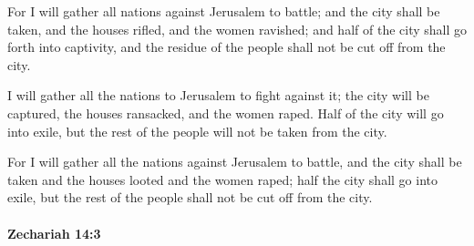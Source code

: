 			\begin{versebox}
					\item[BHS] 
					\item[LXX] 
					\item[ASV] For I will gather all nations against Jerusalem to battle; and the city shall be taken, and the houses rifled, and the women ravished; and half of the city shall go forth into captivity, and the residue of the people shall not be cut off from the city.
					\item[NIV] I will gather all the nations to Jerusalem to fight against it; the city will be captured, the houses ransacked, and the women raped. Half of the city will go into exile, but the rest of the people will not be taken from the city.
					\item[NRSV] For I will gather all the nations against Jerusalem to battle, and the city shall be taken and the houses looted and the women raped; half the city shall go into exile, but the rest of the people shall not be cut off from the city.
			\end{versebox}

		\paragraph{Zechariah 14:3} %
			\label{ZECHARIAH-14-3}

